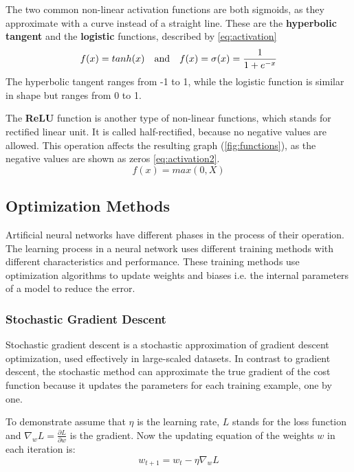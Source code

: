 \bigskip \noindent The two common non-linear activation functions are both sigmoids, as they approximate with a curve instead of a straight line. These are the \textbf{hyperbolic tangent} and the \textbf{logistic} functions, described by \eqref{eq:activation}
\begin{equation} f(x)=tanh(x) ~~~ \hbox{and} ~~~ f(x)=\sigma (x)=\frac{1}{1+e^{-x}} \label{eq:activation} \end{equation}
The hyperbolic tangent ranges from -1 to 1, while the logistic function is similar in shape but ranges from 0 to 1. \medskip

The \textbf{ReLU} function is another type of non-linear functions, which stands for rectified linear unit. It is called half-rectified, because no negative values are allowed. This operation affects the resulting graph (\autoref{fig:functions}), as the negative values are shown as zeros \eqref{eq:activation2}.
\begin{equation} f(x) = max(0,X) \label{eq:activation2} \end{equation}



\subsection{Optimization Methods}

Artificial neural networks have different phases in the process of their operation. The learning process in a neural network uses different training methods with different characteristics and performance. These training methods use optimization algorithms to update weights and biases i.e. the internal parameters of a model to reduce the error. \cite{veerarajan2007numerical, sathasivam2003optimization}



\subsubsection{Stochastic Gradient Descent}

Stochastic gradient descent is a stochastic approximation of gradient descent optimization, used effectively in large-scaled datasets. In contrast to gradient descent, the stochastic method can approximate the true gradient of the cost function because it updates the parameters for each training example, one by one. \smallskip

To demonstrate assume that $\eta$ is the learning rate, $L$ stands for the loss function and $\nabla_w L = \frac{\partial L}{\partial w}$ is the gradient. Now the updating equation of the weights $w$ in each iteration is:
\begin{equation} w_{t+1} = w_t - \eta \nabla_w L \label{eq:sgd} \end{equation} 

